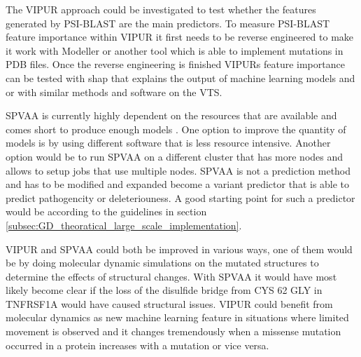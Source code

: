 The VIPUR approach could be investigated to test whether the features generated by PSI-BLAST are the main predictors. To measure PSI-BLAST feature importance within VIPUR it first needs to be reverse engineered to make it work with Modeller or another tool which is able to implement mutations in PDB files. Once the reverse engineering is finished VIPURs feature importance can be tested with shap \cite{slundberg_slundberg/shap:_nodate, strumbelj_explaining_2014, ribeiro_why_2016, shrikumar_learning_2017, datta_algorithmic_nodate, bach_pixel-wise_2015, datadive_interpreting_nodate} that explains the output of machine learning models and or with similar methods and software on the VTS.

SPVAA is currently highly dependent on the resources that are available and comes short to produce enough models \cite{rosetta_commons_analyzing_nodate}. One option to improve the quantity of models is by using different software that is less resource intensive. Another option would be to run SPVAA on a different cluster that has more nodes and allows to setup jobs that use multiple nodes.  SPVAA is not a prediction method and has to be modified and expanded become a variant predictor that is able to predict pathogencity or deleteriouness. A good starting point for such a predictor would be according to the guidelines in section \ref{subsec:GD_theoratical_large_scale_implementation}.

VIPUR and SPVAA could both be improved in various ways, one of them would be by doing molecular dynamic simulations on the mutated structures to determine the effects of structural changes. With SPVAA it would have most likely become clear if the loss of the disulfide bridge from CYS 62 GLY  in TNFRSF1A would have caused structural issues. VIPUR could benefit from molecular dynamics as new machine learning feature in situations where limited movement is observed and it changes tremendously when a missense mutation occurred in a protein increases with a mutation or vice versa.




